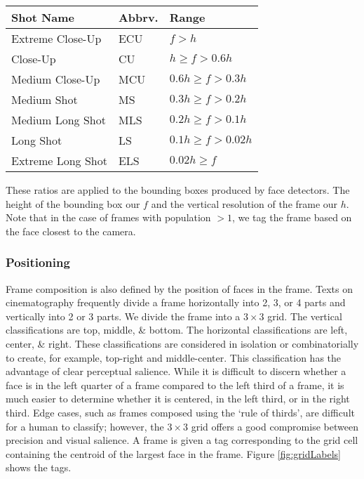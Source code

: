 \begin{center}
  \begin{tabular}{ l | l l}
    Shot Name & Abbrv. & Range \\ \hline
    Extreme Close-Up & ECU & $f > h$ \\ 
    Close-Up & CU & $h \geq f > 0.6h$ \\ 
    Medium Close-Up & MCU & $0.6h \geq f > 0.3h$ \\ 
    Medium Shot & MS & $0.3h \geq f > 0.2h$ \\ 
    Medium Long Shot & MLS & $0.2h \geq f > 0.1h$ \\ 
    Long Shot & LS & $0.1h \geq f > 0.02h$ \\ 
    Extreme Long Shot & ELS & $0.02h \geq f$
    \label{tab:zoomTypes}
  \end{tabular}
\end{center}


These ratios are applied to the bounding boxes produced by face detectors. The height of the bounding box our $f$ and the vertical resolution of the frame our $h$. Note that in the case of frames with population $> 1$, we tag the frame based on the face closest to the camera. 
\subsubsection{Positioning}
Frame composition is also defined by the position of faces in the frame. Texts on cinematography frequently divide a frame horizontally into 2, 3, or 4 parts and vertically into 2 or 3 parts. We divide the frame into a $3\times 3$ grid. The vertical classifications are top, middle, \& bottom. The horizontal classifications are left, center, \& right. These classifications are considered in isolation or combinatorially to create, for example, top-right and middle-center. This classification has the advantage of clear perceptual salience. While it is difficult to discern whether a face is in the left quarter of a frame compared to the left third of a frame, it is much easier to determine whether it is centered, in the left third, or in the right third. Edge cases, such as frames composed using the `rule of thirds', are difficult for a human to classify; however, the $3\times 3$ grid offers a good compromise between precision and visual salience. A frame is given a tag corresponding to the grid cell containing the centroid of the largest face in the frame. Figure \ref{fig:gridLabels} shows the tags. %


